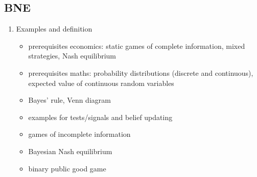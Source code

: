 \documentclass[11pt]{article}
\begin{document}
\subsection{BNE}
\label{sec:orgb4986bd}
\begin{enumerate}
\item Examples and definition
\label{sec:org5d04de6}
\begin{itemize}
\item prerequisites economics: static games of complete information, mixed strategies, Nash equilibrium
\item prerequisites maths: probability distributions (discrete and continuous), expected value of continuous random variables
\item Bayes' rule, Venn diagram
\item examples for tests/signals and belief updating
\item games of incomplete information
\item Bayesian Nash equilibrium
\item binary public good game
\end{itemize}
\end{enumerate}
\end{document}
